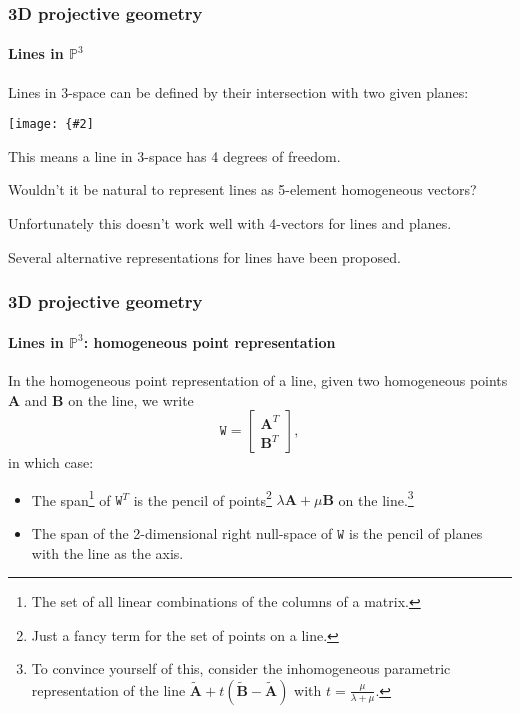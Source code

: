 \documentclass[aspectratio=169]{beamer}
\renewcommand{\vec}[1]{\boldsymbol{#1}}
\newcommand{\mat}[1]{\mathtt{#1}}
\def\Pset{\mathbb{P}}
\newcommand{\myfig}[3]{\centerline{\texttt{[image: \{\#2]}}}
    \centerline{\scriptsize #3}}
\begin{document}
\begin{frame}
\frametitle{3D projective geometry}
\framesubtitle{Lines in $\Pset^3$}

Lines in 3-space can be defined by their \alert{intersection with two
given planes}:

\myfig{2.0in}{HZ-fig2-1}{Hartley and Zisserman (2004) Fig.\ 3.1}

\medskip

This means a line in 3-space has \alert{4 degrees of freedom}.

\medskip

Wouldn't it be natural to represent lines as 5-element homogeneous
vectors?

\medskip

Unfortunately this doesn't work well with 4-vectors for lines and
planes.

\medskip

Several alternative representations for lines have been proposed.

\end{frame}

\begin{frame}
\frametitle{3D projective geometry}
\framesubtitle{Lines in $\Pset^3$: homogeneous point representation}

In the \alert{homogeneous point representation} of a line, given two
homogeneous points $\vec{A}$ and $\vec{B}$ on the line, we write
\begin{equation*}
\mat{W} = \begin{bmatrix} \vec{A}^T \\ \vec{B}^T \end{bmatrix},
\end{equation*}
in which case:
\begin{itemize}
\item The \alert{span}\footnote{The set of all linear combinations of
    the columns of a matrix.} of $\mat{W}^T$ is the \alert{pencil of
    points}\footnote{Just a fancy term for the set of points on a
    line.}  $\lambda \vec{A} + \mu \vec{B}$ on the line.\footnote{To
    convince yourself of this, consider the inhomogeneous parametric
    representation of the line
    $\tilde{\vec{A}}+t(\tilde{\vec{B}}-\tilde{\vec{A}})$ with
    $t=\frac{\mu}{\lambda+\mu}$.}
\item The span of the 2-dimensional right \alert{null-space} of
  $\mat{W}$ is the \alert{pencil of planes} with the line as the axis.
\end{itemize}

\end{frame}
\end{document}
